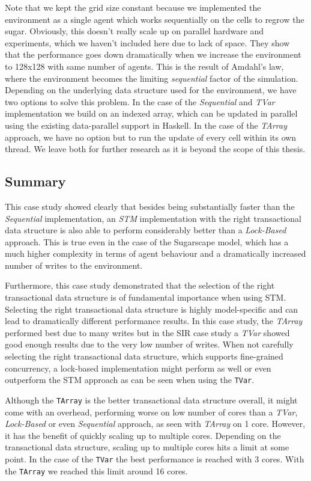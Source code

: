 Note that we kept the grid size constant because we implemented the environment as a single agent which works sequentially on the cells to regrow the sugar. Obviously, this doesn't really scale up on parallel hardware and experiments, which we haven't included here due to lack of space. They show that the performance goes down dramatically when we increase the environment to 128x128 with same number of agents. This is the result of Amdahl's law, where the environment becomes the limiting \textit{sequential} factor of the simulation. Depending on the underlying data structure used for the environment, we have two options to solve this problem. In the case of the \textit{Sequential} and \textit{TVar} implementation we build on an indexed array, which can be updated in parallel using the existing data-parallel support in Haskell. In the case of the \textit{TArray} approach, we have no option but to run the update of every cell within its own thread. We leave both for further research as it is beyond the scope of this thesis.

\subsection{Summary}
This case study showed clearly that besides being substantially faster than the \textit{Sequential} implementation, an \textit{STM} implementation with the right transactional data structure is also able to perform considerably better than a \textit{Lock-Based} approach. This is true even in the case of the Sugarscape model, which has a much higher complexity in terms of agent behaviour and a dramatically increased number of writes to the environment.

Furthermore, this case study demonstrated that the selection of the right transactional data structure is of fundamental importance when using STM. Selecting the right transactional data structure is highly model-specific and can lead to dramatically different performance results. In this case study, the \textit{TArray} performed best due to many writes but in the SIR case study a \textit{TVar} showed good enough results due to the very low number of writes. When not carefully selecting the right transactional data structure, which supports fine-grained concurrency, a lock-based implementation might perform as well or even outperform the STM approach as can be seen when using the \texttt{TVar}.

Although the \texttt{TArray} is the better transactional data structure overall, it might come with an overhead, performing worse on low number of cores than a \textit{TVar}, \textit{Lock-Based} or even \textit{Sequential} approach, as seen with \textit{TArray} on 1 core. However, it has the benefit of quickly scaling up to multiple cores. Depending on the transactional data structure, scaling up to multiple cores hits a limit at some point. In the case of the \texttt{TVar} the best performance is reached with 3 cores. With the \texttt{TArray} we reached this limit around 16 cores.

